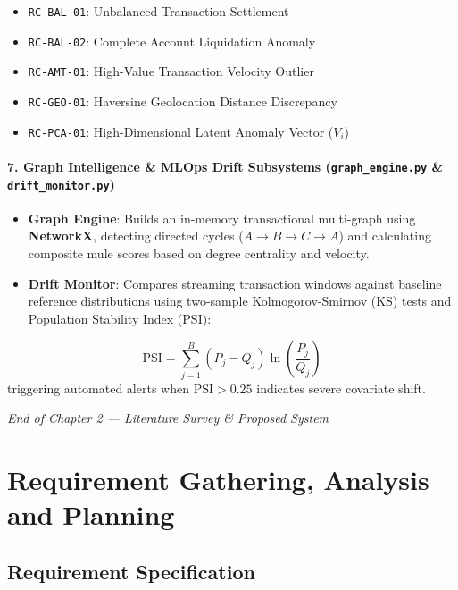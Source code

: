 \documentclass[12pt,a4paper,oneside]{report}
\begin{document}
\begin{itemize}[leftmargin=0.35in]
\item \texttt{RC-BAL-01}: Unbalanced Transaction Settlement
\item \texttt{RC-BAL-02}: Complete Account Liquidation Anomaly
\item \texttt{RC-AMT-01}: High-Value Transaction Velocity Outlier
\item \texttt{RC-GEO-01}: Haversine Geolocation Distance Discrepancy
\item \texttt{RC-PCA-01}: High-Dimensional Latent Anomaly Vector ($V_i$)
\end{itemize}

\subsubsection{7. Graph Intelligence \& MLOps Drift Subsystems (\texttt{graph\_engine.py} \& \texttt{drift\_monitor.py})}
\begin{itemize}[leftmargin=0.35in]
\item \textbf{Graph Engine}: Builds an in-memory transactional multi-graph using \textbf{NetworkX}, detecting directed cycles ($A \rightarrow B \rightarrow C \rightarrow A$) and calculating composite mule scores based on degree centrality and velocity.
\item \textbf{Drift Monitor}: Compares streaming transaction windows against baseline reference distributions using two-sample Kolmogorov-Smirnov (KS) tests and Population Stability Index (PSI):
\end{itemize}
\begin{equation}
\text{PSI} = \sum_{j=1}^B \left( P_j - Q_j \right) \ln\left(\frac{P_j}{Q_j}\right)
\end{equation}
triggering automated alerts when $\text{PSI} > 0.25$ indicates severe covariate shift.



\textit{End of Chapter 2 --- Literature Survey \& Proposed System}


\newpage


\chapter{Requirement Gathering, Analysis and Planning}

\section{Requirement Specification}
\end{document}
